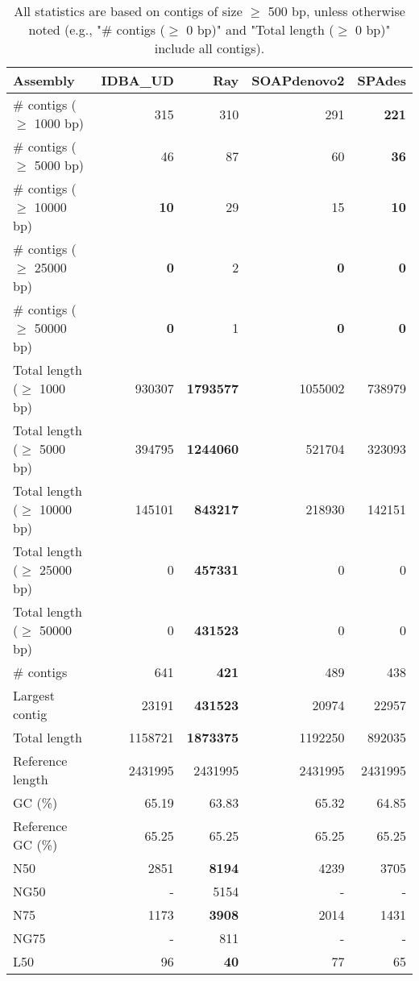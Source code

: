 \documentclass[12pt,a4paper]{article}
\begin{document}
\begin{table}[ht]
\begin{center}
\caption{All statistics are based on contigs of size $\geq$ 500 bp, unless otherwise noted (e.g., "\# contigs ($\geq$ 0 bp)" and "Total length ($\geq$ 0 bp)" include all contigs).}
\begin{tabular}{|l*{4}{|r}|}
\hline
Assembly & IDBA\_UD & Ray & SOAPdenovo2 & SPAdes \\ \hline
\# contigs ($\geq$ 1000 bp) & 315 & 310 & 291 & {\bf 221} \\ \hline
\# contigs ($\geq$ 5000 bp) & 46 & 87 & 60 & {\bf 36} \\ \hline
\# contigs ($\geq$ 10000 bp) & {\bf 10} & 29 & 15 & {\bf 10} \\ \hline
\# contigs ($\geq$ 25000 bp) & {\bf 0} & 2 & {\bf 0} & {\bf 0} \\ \hline
\# contigs ($\geq$ 50000 bp) & {\bf 0} & 1 & {\bf 0} & {\bf 0} \\ \hline
Total length ($\geq$ 1000 bp) & 930307 & {\bf 1793577} & 1055002 & 738979 \\ \hline
Total length ($\geq$ 5000 bp) & 394795 & {\bf 1244060} & 521704 & 323093 \\ \hline
Total length ($\geq$ 10000 bp) & 145101 & {\bf 843217} & 218930 & 142151 \\ \hline
Total length ($\geq$ 25000 bp) & 0 & {\bf 457331} & 0 & 0 \\ \hline
Total length ($\geq$ 50000 bp) & 0 & {\bf 431523} & 0 & 0 \\ \hline
\# contigs & 641 & {\bf 421} & 489 & 438 \\ \hline
Largest contig & 23191 & {\bf 431523} & 20974 & 22957 \\ \hline
Total length & 1158721 & {\bf 1873375} & 1192250 & 892035 \\ \hline
Reference length & 2431995 & 2431995 & 2431995 & 2431995 \\ \hline
GC (\%) & 65.19 & 63.83 & 65.32 & 64.85 \\ \hline
Reference GC (\%) & 65.25 & 65.25 & 65.25 & 65.25 \\ \hline
N50 & 2851 & {\bf 8194} & 4239 & 3705 \\ \hline
NG50 & - & 5154 & - & - \\ \hline
N75 & 1173 & {\bf 3908} & 2014 & 1431 \\ \hline
NG75 & - & 811 & - & - \\ \hline
L50 & 96 & {\bf 40} & 77 & 65 \\ \hline

\end{tabular}
\end{center}
\end{table}
\end{document}
